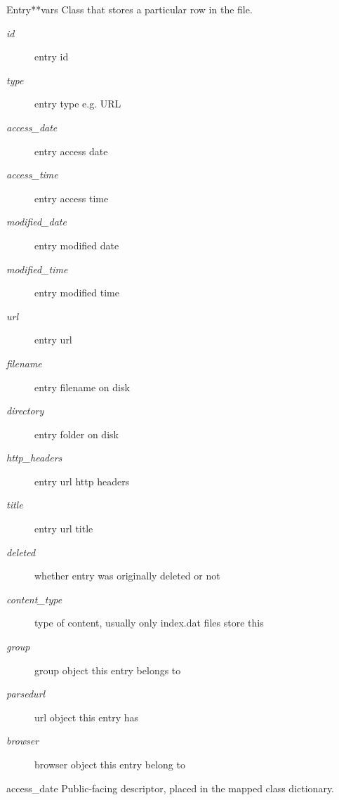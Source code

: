 \documentclass[letterpaper,10pt,english]{manual}
\begin{document}
\hypertarget{webscavator.model.models.Entry}{}\begin{classdesc}{Entry}{**vars}
Class that stores a particular row in the file.
\begin{description}
\item[\emph{id}]
entry id

\item[\emph{type}]
entry type e.g. URL

\item[\emph{access\_date}]
entry access date

\item[\emph{access\_time}]
entry access time

\item[\emph{modified\_date}]
entry modified date

\item[\emph{modified\_time}]
entry modified time

\item[\emph{url}]
entry url

\item[\emph{filename}]
entry filename on disk

\item[\emph{directory}]
entry folder on disk

\item[\emph{http\_headers}]
entry url http headers

\item[\emph{title}]
entry url title

\item[\emph{deleted}]
whether entry was originally deleted or not

\item[\emph{content\_type}]
type of content, usually only index.dat files store this

\item[\emph{group}]
group object this entry belongs to

\item[\emph{parsedurl}]
url object this entry has

\item[\emph{browser}]
browser object this entry belong to

\end{description}

\hypertarget{webscavator.model.models.Entry.access_date}{}\begin{memberdesc}{access\_date}
Public-facing descriptor, placed in the mapped class dictionary.
\end{memberdesc}


\end{classdesc}
\end{document}
